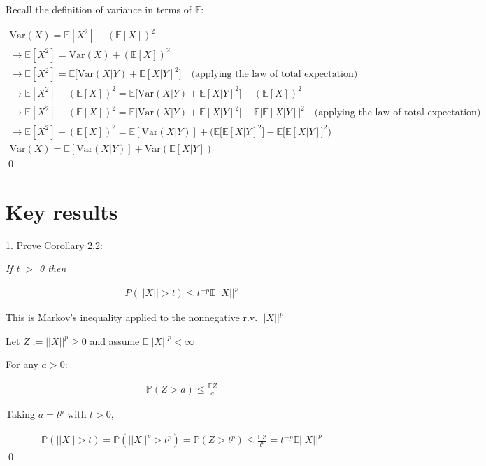 \documentclass[10pt]{article}
\begin{document}
Recall the definition of variance in terms of $\mathbb{E}$:

\begin{gather*}
    \text{Var}(X) = \mathbb{E}[X^2] - (\mathbb{E}[X])^2 \\
    \to \mathbb{E}[X^2] = \text{Var}(X) + (\mathbb{E}[X])^2 \\
    \to \mathbb{E}[X^2] = \mathbb{E}\big[\text{Var}(X|Y) + \mathbb{E}[X|Y]^2\big] \quad\text{(applying the law of total expectation)} \\
    \to \mathbb{E}[X^2] - (\mathbb{E}[X])^2 = \mathbb{E}\big[\text{Var}(X|Y) + \mathbb{E}[X|Y]^2\big] - (\mathbb{E}[X])^2 \\ 
    \to \mathbb{E}[X^2] - (\mathbb{E}[X])^2 = \mathbb{E}\big[\text{Var}(X|Y) + \mathbb{E}[X|Y]^2\big] - \mathbb{E}\big[\mathbb{E}[X|Y]\big]^2\quad\text{(applying the law of total expectation)} \\
    \to \mathbb{E}[X^2] - (\mathbb{E}[X])^2 = \mathbb{E}[\text{Var}(X|Y)] + \Big(\mathbb{E}\big[\mathbb{E}[X|Y]^2\big] - \mathbb{E}\big[\mathbb{E}[X|Y]\big]^2\Big) \\
    \text{Var}(X) = \mathbb{E}[\text{Var}(X|Y)] + \text{Var}(\mathbb{E}[X|Y])
\end{gather*}
\qed

\newpage

\section{Key results}

1. Prove Corollary 2.2:

\textit{If t $>$ 0 then}

\begin{gather*}
    P(||X|| > t) \leq t^{-p}\mathbb{E}||X||^{p}
\end{gather*}

This is Markov's inequality applied to the nonnegative r.v. $||X||^{p}$

Let $Z:=||X||^{p} \geq 0$ and assume $\mathbb{E}||X||^{p} < \infty$

For any $a > 0$: 

\begin{gather*}
    \mathbb{P}(Z > a) \leq \frac{\mathbb{E}Z}{a}
\end{gather*}

Taking $a = t^{p}$ with $t > 0$,

\begin{gather*}
    \mathbb{P}(||X|| > t) = \mathbb{P}(||X||^{p} > t^{p}) = \mathbb{P}(Z > t^{p}) \leq \frac{\mathbb{E}Z}{t^{p}} = t^{-p}\mathbb{E}||X||^{p}
\end{gather*}
\qed
\end{document}
